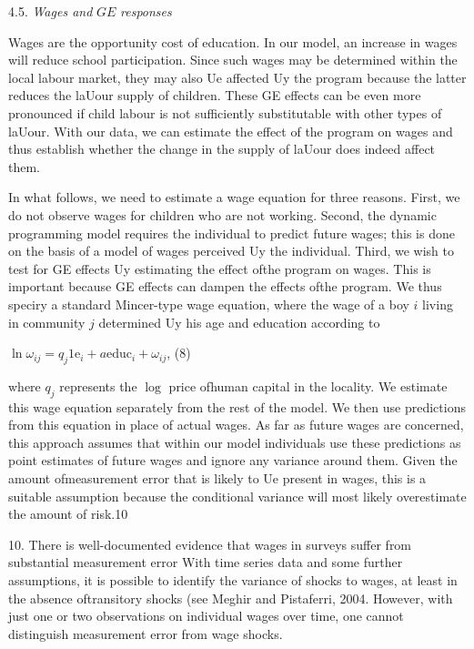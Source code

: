 4.5. {\it Wages and} $GE$ {\it responses}

Wages are the opportunity cost of education. In our model, an increase in wages will reduce school participation. Since such wages may be determined within the local labour market, they may also Ue affected Uy the program because the latter reduces the laUour supply of children. These GE effects can be even more pronounced if child labour is not sufficiently substitutable with other types of laUour. With our data, we can estimate the effect of the program on wages and thus establish whether the change in the supply of laUour does indeed affect them.

In what follows, we need to estimate a wage equation for three reasons. First, we do not observe wages for children who are not working. Second, the dynamic programming model requires the individual to predict future wages; this is done on the basis of a model of wages perceived Uy the individual. Third, we wish to test for GE effects Uy estimating the effect ofthe program on wages. This is important because GE effects can dampen the effects ofthe program. We thus speciry a standard Mincer-type wage equation, where the wage of a boy $i$ living in community $j$ determined Uy his age and education according to
\begin{center}
$\ln\omega_{ij}=q_{j}1\mathrm{e}_{i}+a\mathrm{e}\mathrm{d}\mathrm{u}\mathrm{c}_{i}+\omega_{ij}$,   (8)
\end{center}
where $q_{j}$ represents the $\log$ price ofhuman capital in the locality. We estimate this wage equation separately from the rest of the model. We then use predictions from this equation in place of actual wages. As far as future wages are concerned, this approach assumes that within our model individuals use these predictions as point estimates of future wages and ignore any variance around them. Given the amount ofmeasurement error that is likely to Ue present in wages, this is a suitable assumption because the conditional variance will most likely overestimate the amount of risk.10

10. There is well-documented evidence that wages in surveys suffer from substantial measurement error With time series data and some further assumptions, it is possible to identify the variance of shocks to wages, at least in the absence oftransitory shocks (see Meghir and Pistaferri, 2004. However, with just one or two observations on individual wages over time, one cannot distinguish measurement error from wage shocks.

